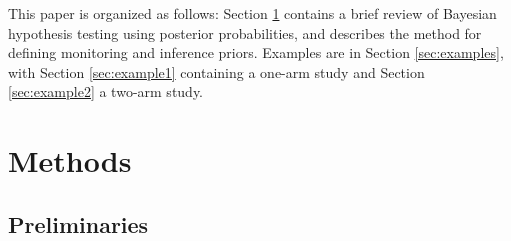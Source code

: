 \documentclass[useAMS,usenatbib,referee]{biom}
\begin{document}
This paper is organized as follows: Section \ref{sec:methods} contains a brief review of Bayesian hypothesis testing using posterior probabilities, and describes the method for defining monitoring and inference priors. Examples are in Section \ref{sec:examples}, with Section \ref{sec:example1} containing a one-arm study and Section \ref{sec:example2} a two-arm study.









\section{Methods}\label{sec:methods}

\subsection{Preliminaries}\label{sec:preliminaries}
\end{document}
